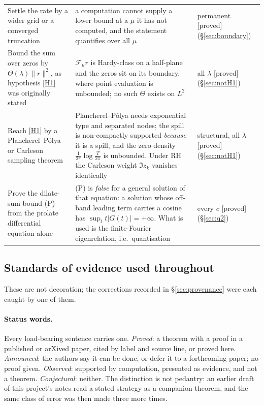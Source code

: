 \documentclass[11pt,a4paper]{article}
\theoremstyle{plain}
\theoremstyle{definition}
\theoremstyle{remark}
\newcommand{\st}[1]{{\normalfont\sffamily\footnotesize[#1]}}
\newcommand{\proved}{\st{proved}}
\newcommand{\F}{\mathcal{F}}
\begin{document}
\begin{center}
\begin{tabular}{@{}p{}p{}p{}@{}}
Settle the rate by a wider grid or a converged truncation
& a computation cannot supply a lower bound at a $\mu$ it has not computed, and
the statement quantifies over all $\mu$
& permanent \proved{} (\S\ref{sec:boundary}) \\
Bound the sum over zeros by $\Theta(\lambda)\|r\|^2$, as
hypothesis \eqref{H1} was originally stated
& $\F_\mu r$ is Hardy-class on a half-plane and the zeros sit on its boundary,
where point evaluation is unbounded; no such $\Theta$ exists on $L^2$
& all $\lambda$ \proved{} (\S\ref{sec:notH1}) \\
Reach \eqref{H1} by a Plancherel--P\'olya or Carleson sampling theorem
& Plancherel--P\'olya needs exponential type and separated nodes; the spill is
non-compactly supported \emph{because} it is a spill, and the zero density
$\tfrac1{2\pi}\log\tfrac{T}{2\pi}$ is unbounded.  Under RH the Carleson weight
$\Im z_k$ vanishes identically
& structural, all $\lambda$ \proved{} (\S\ref{sec:notH1}) \\
Prove the dilate-sum bound (P) from the prolate differential equation alone
& (P) is \emph{false} for a general solution of that equation: a solution whose
off-band leading term carries a cosine has $\sup_t t|G(t)|=+\infty$.  What is
used is the finite-Fourier eigenrelation, i.e.\ quantisation
& every $c$ \proved{} (\S\ref{sec:q2}) \\
\hline
\end{tabular}
\end{center}

\subsection{Standards of evidence used throughout}
\label{sec:standards}

These are not decoration; the corrections recorded in \S\ref{sec:provenance}
were each caught by one of them.

\paragraph{Status words.}  Every load-bearing sentence carries one.
\emph{Proved}: a theorem with a proof in a published or arXived paper, cited by
label and source line, or proved here.  \emph{Announced}: the authors say it can
be done, or defer it to a forthcoming paper; no proof given.  \emph{Observed}:
supported by computation, presented as evidence, and not a theorem.
\emph{Conjectural}: neither.  The distinction is not pedantry: an earlier draft
of this project's notes read a stated strategy as a companion theorem, and the
same class of error was then made three more times.
\end{document}
